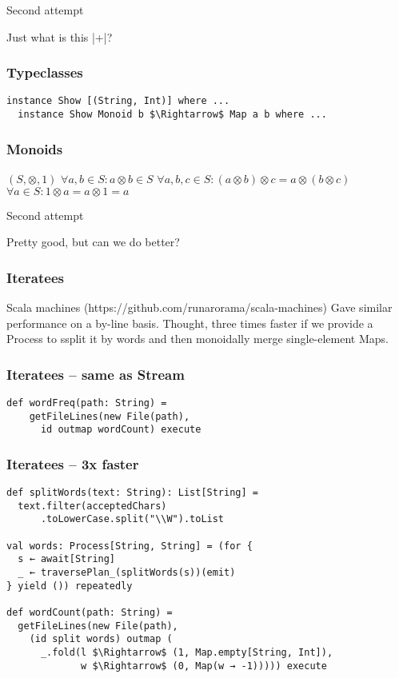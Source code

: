 \documentclass{beamer}
\begin{document}
\begin{frame}{Second attempt}
  \Large \centerline{Just what is this |+|?}
\end{frame}

\begin{frame}[fragile]
\frametitle{Typeclasses}
\begin{lstlisting}[mathescape]
  instance Show [(String, Int)] where ...
  instance Show Monoid b $\Rightarrow$ Map a b where ...
\end{lstlisting}
\end{frame}

\begin{frame}[fragile]
\frametitle{Monoids}
\begin{center}
$(S, \otimes, 1)$\newline
$\forall a, b \in S: a \otimes b \in S$\newline
$\forall a, b, c \in S: (a \otimes b) \otimes c = a \otimes (b \otimes c)$\newline
$\forall a \in S: 1 \otimes a = a \otimes 1 = a$\newline
\end{center}
\end{frame}

\begin{frame}{Second attempt}
  \Large \centerline{Pretty good, but can we do better?}
\end{frame}

\begin{frame}[fragile]
\frametitle{Iteratees}
Scala machines (https://github.com/runarorama/scala-machines)
Gave similar performance on a by-line basis.
Thought, three times faster if we provide a Process to ssplit it by
words and then monoidally merge single-element Maps.
\end{frame}

\begin{frame}[fragile]
\frametitle{Iteratees -- same as Stream}
\begin{lstlisting}[mathescape]
  def wordFreq(path: String) =
    getFileLines(new File(path),
      id outmap wordCount) execute
\end{lstlisting}
\end{frame}

\begin{frame}[fragile]
\frametitle{Iteratees -- 3x faster}
\begin{lstlisting}[mathescape]
def splitWords(text: String): List[String] =
  text.filter(acceptedChars)
      .toLowerCase.split("\\W").toList

val words: Process[String, String] = (for {
  s ← await[String]
  _ ← traversePlan_(splitWords(s))(emit)
} yield ()) repeatedly

def wordCount(path: String) =
  getFileLines(new File(path),
    (id split words) outmap (
      _.fold(l $\Rightarrow$ (1, Map.empty[String, Int]),
             w $\Rightarrow$ (0, Map(w → -1))))) execute
\end{lstlisting}
\end{frame}
\end{document}
